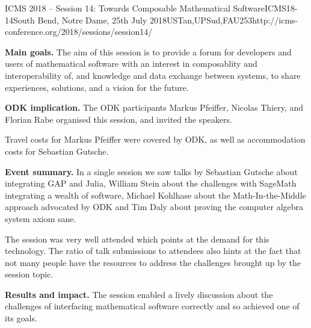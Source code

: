 \begin{event}{ICMS 2018 -- Session 14: Towards Composable Mathematical Software}{ICMS18-14}{South Bend, Notre Dame, 25th July 2018}{USTan,UPSud,FAU}{25}{3}{http://icms-conference.org/2018/sessions/session14/}

\textbf{Main goals.} The aim of this session is to provide a forum for
developers and users of mathematical software with an interest in composablity
and interoperability of, and knowledge and data exchange between systems, to
share experiences, solutions, and a vision for the future.

\textbf{ODK implication.} The ODK participants Markus Pfeiffer, Nicolas Thiery,
and Florian Rabe organised this session, and invited the speakers.

Travel costs for Markus Pfeiffer were covered by ODK, as well as accommodation
costs for Sebastian Gutsche.

\textbf{Event summary.} In a single session we saw talks by Sebastian Gutsche
about integrating GAP and Julia, William Stein about the challenges with
SageMath integrating a wealth of software, Michael Kohlhase about the
Math-In-the-Middle approach advocated by ODK and Tim Daly about proving the
computer algebra system axiom sane.

The session was very well attended which points at the demand for this
technology. The ratio of talk submissions to attendees also hints at the fact
that not many people have the resources to address the challenges brought up by
the session topic.

\textbf{Results and impact.} The session enabled a lively discussion about the
challenges of interfacing mathematical software correctly and so achieved one of
its goals.

\end{event}

